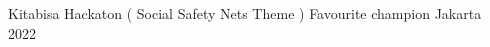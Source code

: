 


\begin{cvhonors}

  \cvhonor
    {Kitabisa Hackaton ( Social Safety  Nets Theme )} %
    {Favourite champion} %
    {Jakarta} %
    {2022} %
\end{cvhonors}
